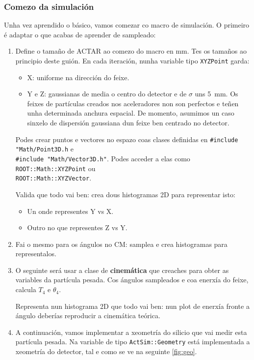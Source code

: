 \documentclass[11pt, a4paper]{article}
\begin{document}
\subsubsection*{Comezo da simulación}
Unha vez aprendido o básico, vamos comezar co macro de simulación. O primeiro é adaptar o que acabas de aprender de sampleado:
\begin{enumerate}
    \item Define o tamaño de ACTAR ao comezo do macro en \unit{\mm}. Tes os tamaños ao principio deste guión. En cada iteración, nunha variable tipo \lstinline|XYZPoint| garda:
          \begin{itemize}
              \item X: uniforme na dirección do feixe.
              \item Y e Z: gaussianas de media o centro do detector e de $\sigma$ uns \qty{5}{\mm}. Os feixes de partículas creados nos aceleradores non son perfectos e teñen unha determinada anchura espacial. De momento, asumimos un caso sinxelo de dispersión gaussiana dun feixe ben centrado no detector.
          \end{itemize}
          Podes crear puntos e vectores no espazo coas clases definidas en \lstinline|#include "Math/Point3D.h| e \\ \lstinline|#include "Math/Vector3D.h"|. Podes acceder a elas como \lstinline|ROOT::Math::XYZPoint| ou \\ \lstinline|ROOT::Math::XYZVector|.

          Valida que todo vai ben: crea dous histogramas 2D para representar isto:
          \begin{itemize}
              \item Un onde representes Y vs X.
              \item Outro no que representes Z vs Y.
          \end{itemize}
          \item  Fai o mesmo para os ángulos no CM: samplea e crea histogramas para representalos.

          \item   O seguinte será usar a clase de \textbf{cinemática} que creaches para obter as variables da partícula pesada. Cos ángulos sampleados e coa enerxía do feixe, calcula $T_4$ e $\theta_{4}$.
          
          Representa nun histograma 2D que todo vai ben: nun plot de enerxía fronte a ángulo deberías reproducir a cinemática teórica.

          \item  A continuación, vamos implementar a xeometría do silicio que vai medir esta partícula pesada. Na variable de tipo \lstinline|ActSim::Geometry| está implementada a xeometría do detector, tal e como se ve na seguinte \autoref{fig:geo}. 


\end{enumerate}
\end{document}
